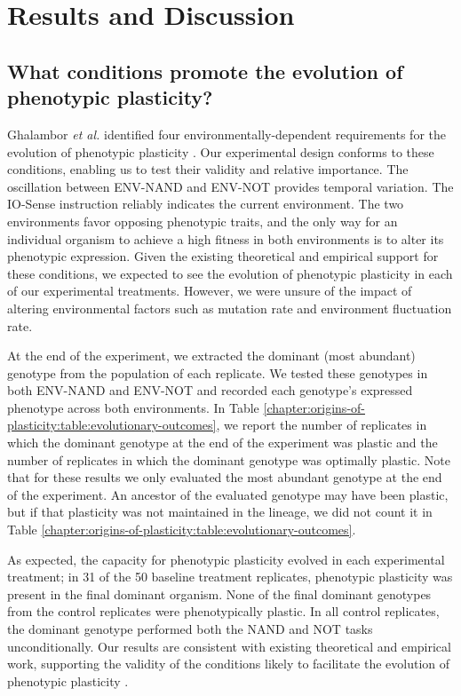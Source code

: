 \section{Results and Discussion}

\begin{raggedright}
\subsection{What conditions promote the evolution of phenotypic plasticity?}
\end{raggedright}

Ghalambor \textit{et al.} identified four environmentally-dependent requirements for the evolution of phenotypic plasticity
\citep{ghalambor_behavior_2010}. 
Our experimental design conforms to these conditions, enabling us to test their validity and relative importance. 
The oscillation between ENV-NAND and ENV-NOT provides temporal variation. 
The IO-Sense instruction reliably indicates the current environment. 
The two environments favor opposing phenotypic traits, and the only way for an individual organism to achieve a high fitness in both environments is to alter its phenotypic expression. 
Given the existing theoretical and empirical support for these conditions, we expected to see the evolution of phenotypic plasticity in each of our experimental treatments. 
However, we were unsure of the impact of altering environmental factors such as mutation rate and environment fluctuation rate. 

At the end of the experiment, we extracted the dominant (most abundant) genotype from the population of each replicate.
We tested these genotypes in both ENV-NAND and ENV-NOT and recorded each genotype's expressed phenotype across both environments. 
In Table \ref{chapter:origins-of-plasticity:table:evolutionary-outcomes}, we report the number of replicates in which the dominant genotype at the end of the experiment was plastic and the number of replicates in which the dominant genotype was optimally plastic. 
Note that for these results we only evaluated the most abundant genotype at the end of the experiment. 
An ancestor of the evaluated genotype may have been plastic, but if that plasticity was not maintained in the lineage, we did not count it in Table \ref{chapter:origins-of-plasticity:table:evolutionary-outcomes}. 

As expected, the capacity for phenotypic plasticity evolved in each experimental treatment; in 31 of the 50 baseline treatment replicates, phenotypic plasticity was present in the final dominant organism. 
None of the final dominant genotypes from the control replicates were phenotypically plastic. 
In all control replicates, the dominant genotype performed both the NAND and NOT tasks unconditionally. 
Our results are consistent with existing theoretical and empirical work, supporting the validity of the conditions likely to facilitate the evolution of phenotypic plasticity \citep{clune_investigating_2007,ghalambor_behavior_2010,hallsson_selection_2012,nolfi_phenotypic_1994}. 

